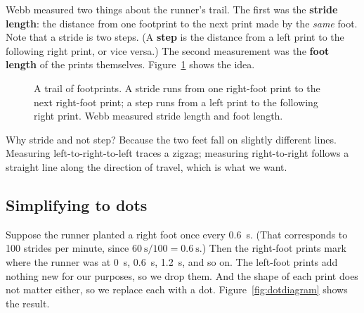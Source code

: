 \documentclass[11pt,twoside,openany]{book}
\begin{document}
Webb measured two things about the runner's trail. The first was the \textbf{stride length}: the distance from one footprint to the next print made by the \emph{same} foot. Note that a stride is two steps. (A \textbf{step} is the distance from a left print to the following right print, or vice versa.) The second measurement was the \textbf{foot length} of the prints themselves. Figure~\ref{fig:footprints} shows the idea.

\begin{figure}[htb]
\centering
{}
\caption{A trail of footprints. A stride runs from one right-foot print to the next right-foot print; a step runs from a left print to the following right print. Webb measured stride length and foot length.}
\label{fig:footprints}
\end{figure}

Why stride and not step? Because the two feet fall on slightly different lines. Measuring left-to-right-to-left traces a zigzag; measuring right-to-right follows a straight line along the direction of travel, which is what we want.

\subsection{Simplifying to dots}

Suppose the runner planted a right foot once every \SI{0.6}{\second}. (That corresponds to \num{100} strides per minute, since $\SI{60}{\second}/100 = \SI{0.6}{\second}$.) Then the right-foot prints mark where the runner was at \SI{0}{\second}, \SI{0.6}{\second}, \SI{1.2}{\second}, and so on. The left-foot prints add nothing new for our purposes, so we drop them. And the shape of each print does not matter either, so we replace each with a dot. Figure~\ref{fig:dotdiagram} shows the result.
\end{document}
